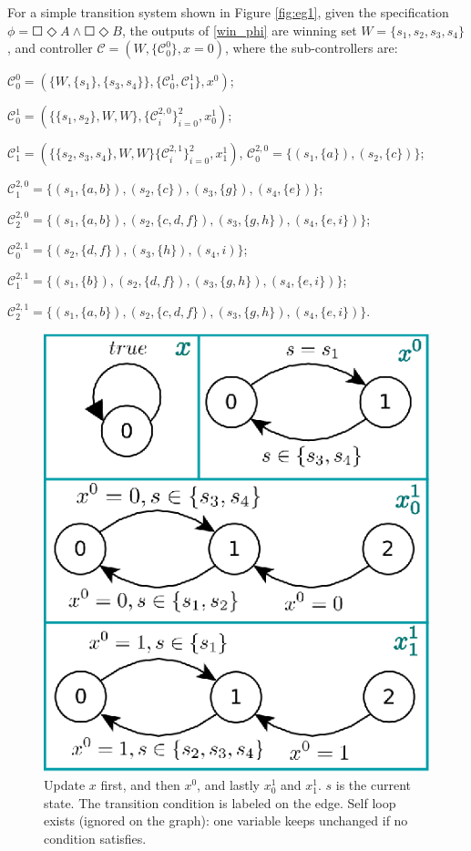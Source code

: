 \begin{example}
	For a simple transition system shown in Figure \ref{fig:eg1}, given the specification $ \phi = \Square \Diamond A \wedge \Square \Diamond B $, the outputs of \eqref{win_phi} are winning set $ W= \{s_1,s_2,s_3,s_4\}$, and controller $ \mathcal{C} = (W,\{\mathcal{C}^0_0\}, x = 0) $, where the sub-controllers are:
	
	$ \mathcal{C}^0_0 = (\{W,\{s_1\},\{s_3,s_4\}\},\{\mathcal{C}^1_0, \mathcal{C}^1_1\}, x^0 ) $; 
	
	$ \mathcal{C}^1_0 = (\{\{s_1,s_2\},W,W \},\{\mathcal{C}^{2,0}_i\}_{i=0}^2,x^1_0)$;
	
	$ \mathcal{C}^1_1 = (\{\{s_2,s_3,s_4\},W,W \}\{\mathcal{C}^{2,1}_i\}_{i=0}^{2},x^1_1 )$, $ \mathcal{C}^{2,0}_0 = \{(s_1,\{a\}),(s_2,\{c\})\} $;
	
	$ \mathcal{C}^{2,0}_1 = \{(s_1,\{a,b\}),(s_2,\{c\}),(s_3,\{g\}),(s_4,\{e\})\} $;
	
	$ \mathcal{C}^{2,0}_2 = \{(s_1,\{a,b\}),(s_2,\{c,d,f\}),(s_3,\{g,h\}),(s_4,\{e,i\})\} $; 
	
	$ \mathcal{C}^{2,1}_0 = \{(s_2,\{d,f\}),(s_3,\{h\}),(s_4,i)\} $; 
	
	$ \mathcal{C}^{2,1}_1 = \{(s_1,\{b\}),(s_2,\{d,f\}), (s_3,\{g,h\}), (s_4,\{e,i\})\} $;
	
	$ \mathcal{C}^{2,1}_2 = \{(s_1,\{a,b\}),(s_2,\{c,d,f\}),(s_3,\{g,h\}),(s_4,\{e,i\})\} $.
	
	\begin{figure}
		\centering
		\includegraphics[width=0.7\linewidth]{pic/xupdate}
		\caption{ Update $ x$ first, and then $ x^0 $, and lastly $ x_0^1 $ and $x^1_1 $. $ s $ is the current state. The transition condition is labeled on the edge. Self loop exists (ignored on the graph): one variable keeps unchanged if no condition satisfies.}
		\label{fig:xupdate}
	\end{figure}
	

\end{example}
